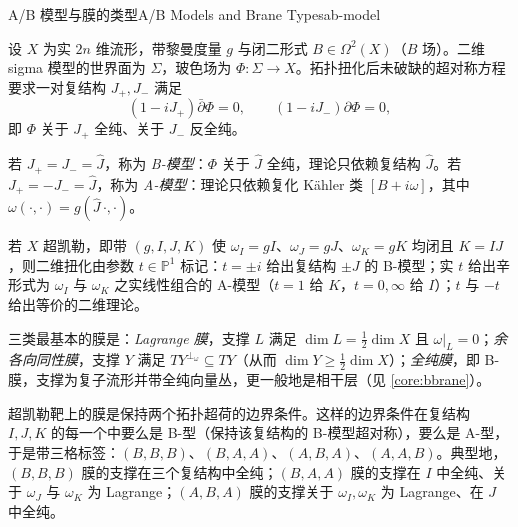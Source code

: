 
\begin{centry}{A/B 模型与膜的类型}{A/B Models and Brane Types}{ab-model}

\begin{definition}[A-模型与 B-模型]
设 $X$ 为实 $2n$ 维流形，带黎曼度量 $g$ 与闭二形式 $B\in\Omega^2(X)$（$B$ 场）。二维 sigma 模型的世界面为 $\Sigma$，玻色场为 $\Phi:\Sigma\to X$。拓扑扭化后未破缺的超对称方程要求一对复结构 $J_+,J_-$ 满足
\[
(1-iJ_+)\bar\partial\Phi=0,\qquad (1-iJ_-)\partial\Phi=0,
\]
即 $\Phi$ 关于 $J_+$ 全纯、关于 $J_-$ 反全纯。

若 $J_+=J_-=\hat J$，称为 \emph{B-模型}：$\Phi$ 关于 $\hat J$ 全纯，理论只依赖复结构 $\hat J$。若 $J_+=-J_-=\hat J$，称为 \emph{A-模型}：理论只依赖复化 Kähler 类 $[B+i\omega]$，其中 $\omega(\cdot,\cdot)=g(\hat J\,\cdot,\cdot)$。

若 $X$ 超凯勒，即带 $(g,I,J,K)$ 使 $\omega_I=gI$、$\omega_J=gJ$、$\omega_K=gK$ 均闭且 $K=IJ$，则二维扭化由参数 $t\in\mathbb{P}^1$ 标记：$t=\pm i$ 给出复结构 $\pm J$ 的 B-模型；实 $t$ 给出辛形式为 $\omega_I$ 与 $\omega_K$ 之实线性组合的 A-模型（$t=1$ 给 $K$，$t=0,\infty$ 给 $I$）；$t$ 与 $-t$ 给出等价的二维理论。
\end{definition}

\begin{definition}[膜的类型]
三类最基本的膜是：\emph{Lagrange 膜}，支撑 $L$ 满足 $\dim L=\frac12\dim X$ 且 $\omega|_L=0$；\emph{余各向同性膜}，支撑 $Y$ 满足 $TY^{\perp_\omega}\subseteq TY$（从而 $\dim Y\ge\frac12\dim X$）；\emph{全纯膜}，即 B-膜，支撑为复子流形并带全纯向量丛，更一般地是相干层（见 \ref{core:bbrane}）。

超凯勒靶上的膜是保持两个拓扑超荷的边界条件。这样的边界条件在复结构 $I,J,K$ 的每一个中要么是 B-型（保持该复结构的 B-模型超对称），要么是 A-型，于是带三格标签：$(B,B,B)$、$(B,A,A)$、$(A,B,A)$、$(A,A,B)$。典型地，$(B,B,B)$ 膜的支撑在三个复结构中全纯；$(B,A,A)$ 膜的支撑在 $I$ 中全纯、关于 $\omega_J$ 与 $\omega_K$ 为 Lagrange；$(A,B,A)$ 膜的支撑关于 $\omega_I,\omega_K$ 为 Lagrange、在 $J$ 中全纯。
\end{definition}


\end{centry}
